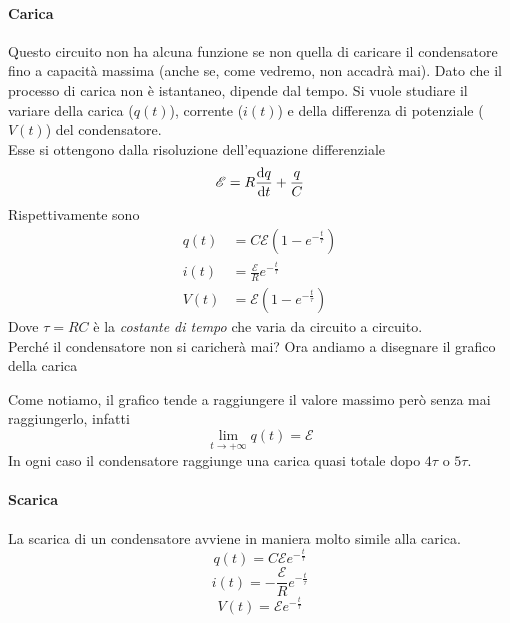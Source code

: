\paragraph{Carica}
Questo circuito non ha alcuna funzione se non quella di caricare il condensatore fino a capacità 
massima (anche se, come vedremo, non accadrà mai). Dato che il processo di carica non è istantaneo,
dipende dal tempo. Si vuole studiare il variare della carica ($q(t)$), corrente ($i(t)$) e
della differenza di potenziale ($V(t)$) del condensatore.\\
Esse si ottengono dalla risoluzione dell'equazione differenziale
\begin{equation*}
  \mathcal{E} = R\frac{\mathop{}\!\mathrm{d} q}{\mathop{}\!\mathrm{d} t}+\frac{q}{C}
\end{equation*}
Rispettivamente sono
\begin{align*}
  q(t)&=C\mathcal{E}\left(1-e^{-\frac{t}{\tau}}\right)\\
  i(t)&=\frac{\mathcal{E}}{R}e^{-\frac{t}{\tau}}\\
  V(t)&=\mathcal{E}\left(1-e^{-\frac{t}{\tau}}\right)
\end{align*}
Dove $\tau=RC$ è la \emph{costante di tempo} che varia da circuito a circuito.\\ [\baselineskip]
Perché il condensatore non si caricherà mai? Ora andiamo
a disegnare il grafico della carica
\begin{center}
\end{center}
Come notiamo, il grafico tende a raggiungere il valore massimo però senza mai raggiungerlo,
infatti
\begin{equation*}
  \lim\limits_{t\to+\infty}q(t) = \mathcal{E}
\end{equation*}
In ogni caso il condensatore raggiunge una carica quasi totale dopo $4\tau$ o $5\tau$.

\paragraph{Scarica}
La scarica di un condensatore avviene in maniera molto simile alla carica.
\begin{equation*}
  q(t) = C\mathcal{E}e^{-\frac{t}{\tau}}
\end{equation*}
\begin{equation*}
  i(t) = -\frac{\mathcal{E}}{R}e^{-\frac{t}{\tau}}
\end{equation*}
\begin{equation*}
  V(t) = \mathcal{E}e^{-\frac{t}{\tau}}
\end{equation*}

